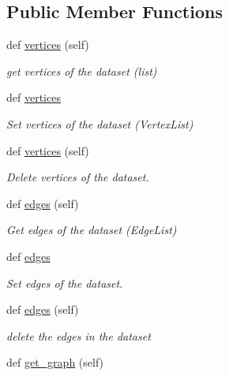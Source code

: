 \subsection*{Public Member Functions}
\begin{DoxyCompactItemize}
\item 
def \hyperlink{classbridges_1_1data__src__dependent_1_1osm_1_1_osm_data_a9d254d1ef4043909d4d2bd4427daae39}{vertices} (self)
\begin{DoxyCompactList}\small\item\em get vertices of the dataset (list) \end{DoxyCompactList}\item 
def \hyperlink{classbridges_1_1data__src__dependent_1_1osm_1_1_osm_data_aaf96716b8b7e7c5810d8858cb3463a8d}{vertices}
\begin{DoxyCompactList}\small\item\em Set vertices of the dataset (Vertex\+List) \end{DoxyCompactList}\item 
def \hyperlink{classbridges_1_1data__src__dependent_1_1osm_1_1_osm_data_a9d254d1ef4043909d4d2bd4427daae39}{vertices} (self)
\begin{DoxyCompactList}\small\item\em Delete vertices of the dataset. \end{DoxyCompactList}\item 
def \hyperlink{classbridges_1_1data__src__dependent_1_1osm_1_1_osm_data_a1ec1018524a570304e80fb662e266f12}{edges} (self)
\begin{DoxyCompactList}\small\item\em Get edges of the dataset (Edge\+List) \end{DoxyCompactList}\item 
def \hyperlink{classbridges_1_1data__src__dependent_1_1osm_1_1_osm_data_a9a25900d86edcef59c6635ffae2dc5c3}{edges}
\begin{DoxyCompactList}\small\item\em Set edges of the dataset. \end{DoxyCompactList}\item 
def \hyperlink{classbridges_1_1data__src__dependent_1_1osm_1_1_osm_data_a1ec1018524a570304e80fb662e266f12}{edges} (self)
\begin{DoxyCompactList}\small\item\em delete the edges in the dataset \end{DoxyCompactList}\item 
def \hyperlink{classbridges_1_1data__src__dependent_1_1osm_1_1_osm_data_a50b43937ae7d87ac21378ed100fce657}{get\+\_\+graph} (self)

\end{DoxyCompactItemize}
